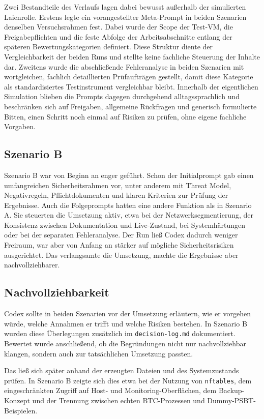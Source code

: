 Zwei Bestandteile des Verlaufs lagen dabei bewusst außerhalb der simulierten Laienrolle. 
Erstens legte ein vorangestellter Meta-Prompt in beiden Szenarien denselben Versuchsrahmen fest.
Dabei wurde der Scope der Test-\acs{VM}, die Freigabepflichten und die feste Abfolge der Arbeitsabschnitte entlang der späteren Bewertungskategorien definiert. Diese Struktur diente der Vergleichbarkeit der beiden Runs und stellte keine fachliche Steuerung der Inhalte dar. 
Zweitens wurde die abschließende Fehleranalyse in beiden Szenarien mit wortgleichen, fachlich detaillierten Prüfaufträgen gestellt, damit diese Kategorie als standardisiertes Testinstrument vergleichbar bleibt. Innerhalb der eigentlichen Simulation blieben die Prompts dagegen durchgehend
alltagssprachlich und beschränken sich auf Freigaben, allgemeine Rückfragen und generisch formulierte Bitten, einen Schritt noch einmal auf Risiken zu prüfen, ohne eigene fachliche Vorgaben.

\subsection{Szenario B}

Szenario B war von Beginn an enger geführt. Schon der Initialprompt gab einen umfangreichen Sicherheitsrahmen vor, unter anderem mit Threat Model, Negativregeln, Pflichtdokumenten und klaren Kriterien zur Prüfung der Ergebnisse. Auch die Folgeprompts hatten eine andere Funktion als in Szenario A. Sie steuerten die Umsetzung aktiv, etwa bei der Netzwerksegmentierung, der Konsistenz zwischen Dokumentation und Live-Zustand, bei Systemhärtungen oder bei der separaten Fehleranalyse. Der Run ließ Codex dadurch weniger Freiraum, war aber von Anfang an stärker auf mögliche Sicherheitsrisiken ausgerichtet. Das verlangsamte die Umsetzung, machte die Ergebnisse aber nachvollziehbarer.

\subsection{Nachvollziehbarkeit}

Codex sollte in beiden Szenarien vor der Umsetzung erläutern, wie er vorgehen würde, welche Annahmen er trifft und welche Risiken bestehen. In Szenario B wurden diese Überlegungen zusätzlich im \texttt{decision-log.md} dokumentiert. Bewertet wurde anschließend, ob die Begründungen nicht nur nachvollziehbar klangen, sondern auch zur tatsächlichen Umsetzung passten.

Das ließ sich später anhand der erzeugten Dateien und des Systemzustands prüfen. In Szenario B zeigte sich dies etwa bei der Nutzung von \texttt{nftables}, dem eingeschränkten Zugriff auf Host- und Monitoring-Oberflächen, dem Backup-Konzept und der Trennung zwischen echten \ac{BTC}-Prozessen und Dummy-\ac{PSBT}-Beispielen.

